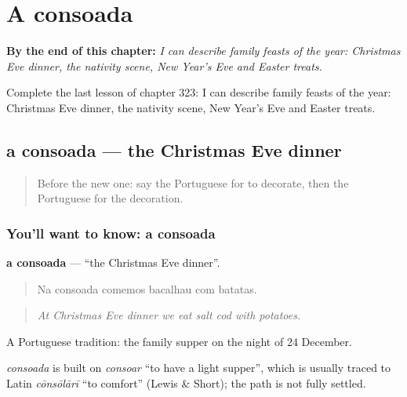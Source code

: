 
\chapter{A consoada}
\label{ch:pt-a-consoada}

\begin{chapteropening}
\textbf{By the end of this chapter:} \emph{I can describe family feasts of the year: Christmas Eve dinner, the nativity scene, New Year’s Eve and Easter treats.}

Complete the last lesson of chapter 323: I can describe family feasts of the year: Christmas Eve dinner, the nativity scene, New Year’s Eve and Easter treats.
\end{chapteropening}

\section[a consoada]{a consoada — the Christmas Eve dinner}

\label{lesson:PT-C323-consoada}



\begin{quote}
Before the new one: say the Portuguese for to decorate, then the Portuguese for the decoration.
\end{quote}

\subsection*{You'll want to know: a consoada}
\textbf{a consoada} — \textquotedblleft{}the Christmas Eve dinner\textquotedblright{}.

\begin{quote}
Na consoada comemos bacalhau com batatas.
\end{quote}

\begin{quote}
\emph{At Christmas Eve dinner we eat salt cod with potatoes.}
\end{quote}

A Portuguese tradition: the family supper on the night of 24 December.

\begin{cousinweb}
\emph{consoada} is built on \emph{consoar} \textquotedblleft{}to have a light supper\textquotedblright{}, which is usually traced to Latin \emph{cōnsōlārī} \textquotedblleft{}to comfort\textquotedblright{} (Lewis \& Short); the path is not fully settled.
\end{cousinweb}

